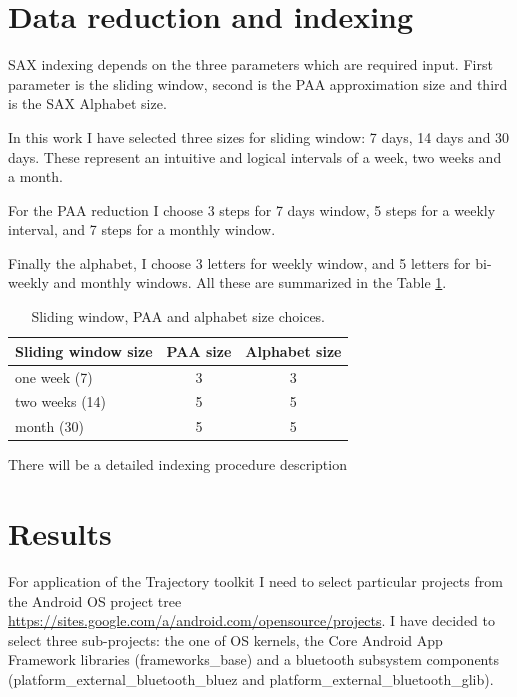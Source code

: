 \documentclass[a4paper,10pt]{article}
\numberwithin{equation}{subsection}
\begin{document}
\section{Data reduction and indexing}
SAX indexing depends on the three parameters which are required input. First parameter is
the sliding window, second is the PAA approximation size and third is the SAX Alphabet size.

In this work I have selected three sizes for sliding window: 7 days, 14 days and 30 days. 
These represent an intuitive and logical intervals of a week, two weeks and a month.

For the PAA reduction I choose 3 steps for 7 days window, 5 steps for a weekly interval,
and 7 steps for a monthly window.

Finally the alphabet, I choose 3 letters for weekly window, and 5 letters for bi-weekly and monthly windows.
All these are summarized in the Table \ref{tab:parameters}.

\begin{table}
  \caption{Sliding window, PAA and alphabet size choices.}
  \centering
  \label{tab:parameters}
  \begin{tabularx}{270pt}{ | X | c | c |}
  \hline                       
  Sliding window size & PAA size & Alphabet size \\
  \hline 
    one week (7) & 3 & 3 \\  
    two weeks (14) & 5 & 5 \\ 
    month (30) & 5 & 5 \\ 
  \hline  
  \end{tabularx}
\end{table}

There will be a detailed indexing procedure description

\section{Results}
For application of the Trajectory toolkit I need to select particular projects from the Android OS
project tree \url{https://sites.google.com/a/android.com/opensource/projects}. I have decided to 
select three sub-projects: the one of OS kernels, the Core Android App Framework libraries 
(frameworks\_base) and a bluetooth subsystem components (platform\_external\_bluetooth\_bluez and 
platform\_external\_bluetooth\_glib).
\end{document}

